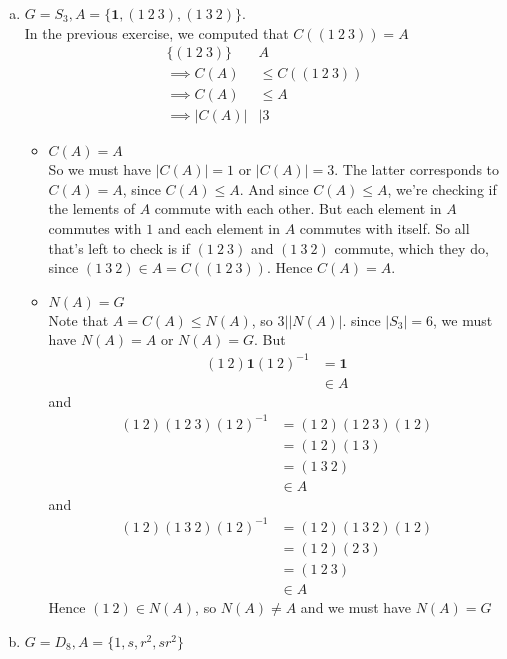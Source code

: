 \documentclass{article}
\newcommand{\set}[1]{ \{ #1 \} }
\newcommand{\inv}[1]{ {#1}^{-1} }
\newcommand{\id}{ \bm{1} }
\newcommand{\norm}[1]{|#1|}
\newcommand{\divides}{\big\vert}
\begin{document}
\subsubsection{}\label{ex2p5}
\begin{enumerate}[(a)]
\item $G=S_3, A=\set{\id, (1\ 2\ 3), (1\ 3\ 2)}$.\\
In the previous exercise, we computed that $C( (1\ 2\ 3) ) = A$
\begin{align*}
\set{(1\ 2\ 3)} & A\\
\implies C(A) &\leq C( (1\ 2\ 3) )\\
\implies C(A) &\leq A\\
\implies \norm{C(A)} &\divides 3
\end{align*}
\begin{itemize}
\item $C(A)=A$\\
So we must have $\norm{C(A)}=1$ or $\norm{C(A)} = 3$. The latter corresponds to $C(A) = A$, since $C(A) \leq A$. And since $C(A) \leq A$, we're checking if the lements of $A$ commute with each other. But each element in $A$ commutes with $1$ and each element in $A$ commutes with itself. So all that's left to check is if $(1\ 2\ 3)$ and $(1\ 3\ 2)$ commute, which they do, since $(1\ 3\ 2) \in A = C( (1\ 2\ 3) )$. Hence $C(A) = A$.
\item $N(A)=G$\\
Note that $A=C(A) \leq N(A)$, so $3 \divides \norm{N(A)}$. since $\norm{S_3} = 6$, we must have $N(A)=A$ or $N(A)=G$. But
\begin{align*}
(1\ 2)\id\inv{(1\ 2)} &= \id\\
&\in A
\end{align*}
and
\begin{align*}
(1\ 2)(1\ 2\ 3)\inv{(1\ 2)} &= (1\ 2)(1\ 2\ 3)(1\ 2)\\
&= (1\ 2)(1\ 3)\\
&= (1\ 3\ 2)\\
&\in A
\end{align*}
and
\begin{align*}
(1\ 2)(1\ 3\ 2)\inv{(1\ 2)} &= (1\ 2)(1\ 3\ 2)(1\ 2)\\
&= (1\ 2)(2\ 3)\\
&= (1\ 2\ 3)\\
&\in A
\end{align*}
Hence $(1\ 2) \in N(A)$, so $N(A) \neq A$ and we must have $N(A) = G$
\end{itemize}
\item $G=D_8, A=\set{1,s,r^2,sr^2}$\\

\end{enumerate}
\end{document}
